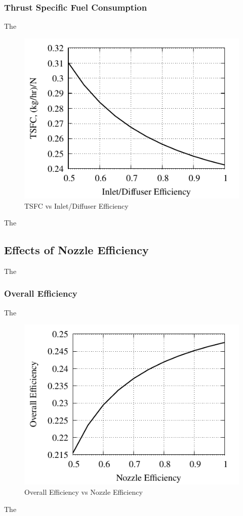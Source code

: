 \documentclass[conf]{new-aiaa} %
\begin{document}
\subsubsection{Thrust Specific Fuel Consumption}
The

\begin{figure}[H] %
    \centering
    \includegraphics[]{media/performance_parameter_files/part_f_TSFC.pdf}
    \caption{\label{fig:partftsfc}TSFC vs Inlet/Diffuser Efficiency}
\end{figure}
The

\subsection{Effects of Nozzle Efficiency} %
The

\subsubsection{Overall Efficiency}
The

\begin{figure}[H] %
    \centering
    \includegraphics[]{media/performance_parameter_files/part_g_eta_o.pdf}
    \caption{\label{fig:partgetao}Overall Efficiency vs Nozzle Efficiency}
\end{figure}
The
\end{document}
